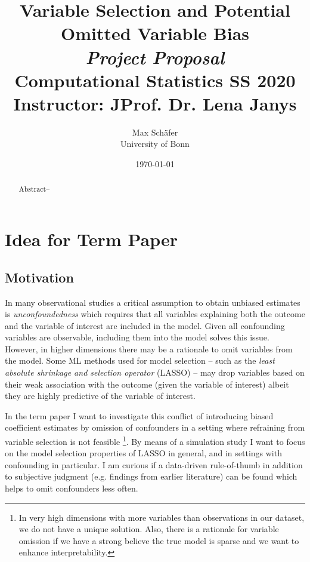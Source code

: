 \documentclass[11pt, a4paper, leqno]{article}
\numberwithin{equation}{section}
\numberwithin{figure}{section}
\numberwithin{table}{section}
\begin{document}
\title{Variable Selection and Potential Omitted Variable Bias \\ \textit{Project Proposal}  \\[0.2em]\smaller{}Computational Statistics SS 2020 \\ Instructor: JProf. Dr. Lena Janys}


\author{Max Schäfer \\[0.2em]\smaller{}University of Bonn}

\date{\today}

\maketitle


\begin{abstract}
	Abstract--
\end{abstract}
\thispagestyle{empty}
\addtocounter{page}{-1}
\clearpage


\section{Idea for Term Paper} %

\subsection{Motivation}
In many observational studies a critical assumption to obtain unbiased estimates is \textit{unconfoundedness} which requires that all variables explaining both the outcome and the variable of interest are included in the model. Given all confounding variables are observable, including them into the model solves this issue. However, in higher dimensions there may be a rationale to omit variables from the model. Some ML methods used for model selection -- such as the \textit{least absolute shrinkage and selection operator} (LASSO) -- may drop variables based on their weak association with the outcome (given the variable of interest) albeit they are highly predictive of the variable of interest. 

In the term paper I want to investigate this conflict of introducing biased coefficient estimates by omission of confounders in a setting where refraining from variable selection is not feasible \footnote{In very high dimensions with more variables than observations in our dataset, we do not have a unique solution. Also, there is a rationale for variable omission if we have a strong believe the true model is sparse and we want to enhance interpretability.}. By means of a simulation study I want to focus on the model selection properties of LASSO in general, and in settings with confounding in particular. I am curious if a data-driven rule-of-thumb in addition to subjective judgment (e.g. findings from earlier literature) can be found which helps to omit confounders less often.
\end{document}
